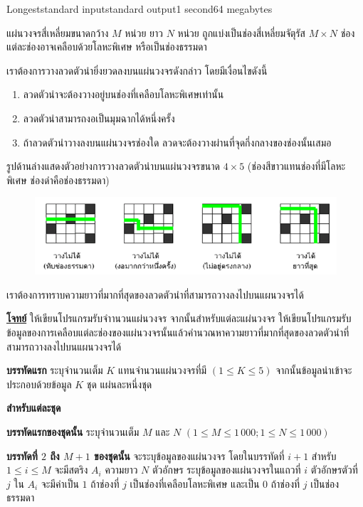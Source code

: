 \documentclass[11pt,a4paper]{article}
\begin{document}
\begin{problem}{Longest}{standard input}{standard output}{1 second}{64 megabytes}


แผ่นวงจรสี่เหลี่ยมขนาดกว้าง $M$ หน่วย ยาว $N$ หน่วย ถูกแบ่งเป็นช่องสี่เหลี่ยมจัตุรัส $M \times N$ ช่อง แต่ละช่องอาจเคลือบด้วยโลหะพิเศษ หรือเป็นช่องธรรมดา

เราต้องการวางลวดตัวนำยิ่งยวดลงบนแผ่นวงจรดังกล่าว โดยมีเงื่อนไขดังนี้
\begin{enumerate}

\item ลวดตัวนำจะต้องวางอยู่บนช่องที่เคลือบโลหะพิเศษเท่านั้น
\item ลวดตัวนำสามารถงอเป็นมุมฉากได้หนึ่งครั้ง
\item ถ้าลวดตัวนำวางลงบนแผ่นวงจรช่องใด ลวดจะต้องวางผ่านที่จุดกึ่งกลางของช่องนั้นเสมอ
\end{enumerate}

รูปด้านล่างแสดงตัวอย่างการวางลวดตัวนำบนแผ่นวงจรขนาด $4 \times 5$ (ช่องสีขาวแทนช่องที่มีโลหะพิเศษ ช่องดำคือช่องธรรมดา)

\begin{figure}[h!]
\centering
\includegraphics[width=1\textwidth]{../latex/img/1058/1058-1.png}
\end{figure}

เราต้องการทราบความยาวที่มากที่สุดของลวดตัวนำที่สามารถวางลงไปบนแผนวงจรได้


\bigskip
\underline{\textbf{โจทย์}}  ให้เขียนโปรแกรมรับจำานวนแผ่นวงจร จากนั้นสำหรับแต่ละแผ่นวงจร ให้เขียนโปรแกรมรับข้อมูลของการเคลือบแต่ละช่องของแผ่นวงจรนั้นแล้วคำนวณหาความยาวที่มากที่สุดของลวดตัวนำที่สามารถวางลงไปบนแผนวงจรได้

\InputFile

\textbf{บรรทัดแรก} ระบุจำนวนเต็ม $K$ แทนจำนวนแผ่นวงจรที่มี $(1\leq K\leq 5)$ จากนั้นข้อมูลนำเข้าจะประกอบด้วยข้อมูล $K$ ชุด แผ่นละหนึ่งชุด

\textbf{สำหรับแต่ละชุด}

\textbf{บรรทัดแรกของชุดนั้น} ระบุจำนวนเต็ม $M$ และ $N$ $(1 \leq M \leq 1\,000; 1 \leq N \leq 1\,000)$ 

\textbf{บรรทัดที่ $2$ ถึง $M+1$ ของชุดนั้น }จะระบุข้อมูลของแผ่นวงจร โดยในบรรทัดที่ $i+1$ สำหรับ $1 \leq i \leq M$ จะมีสตริง $A_i$ ความยาว $N$ ตัวอักษร ระบุข้อมูลของแผ่นวงจรในแถวที่ $i$ ตัวอักษรตัวที่ $j$ ใน $A_i$ จะมีค่าเป็น $1$ ถ้าช่องที่ $j$ เป็นช่องที่เคลือบโลหะพิเศษ และเป็น $0$ ถ้าช่องที่ $j$ เป็นช่องธรรมดา



\end{problem}
\end{document}
